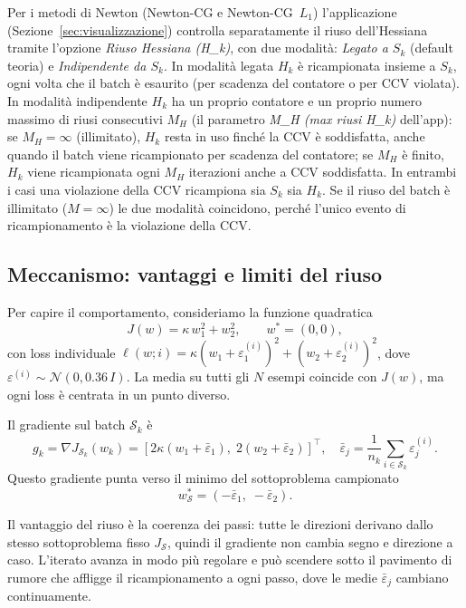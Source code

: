 Per i metodi di Newton (Newton-CG e Newton-CG~$L_1$) l'applicazione
(Sezione~\ref{sec:visualizzazione}) controlla separatamente il riuso
dell'Hessiana tramite l'opzione \emph{Riuso Hessiana (H\_k)}, con due
modalità: \emph{Legato a $S_k$} (default teoria) e \emph{Indipendente da
$S_k$}. In modalità legata $H_k$ è ricampionata insieme a $S_k$, ogni volta
che il batch è esaurito (per scadenza del contatore o per CCV violata). In
modalità indipendente $H_k$ ha un proprio contatore e un proprio numero
massimo di riusi consecutivi $M_H$ (il parametro \emph{M\_H (max riusi H\_k)}
dell'app): se $M_H = \infty$ (illimitato), $H_k$ resta in uso finché la CCV è
soddisfatta, anche quando il batch viene ricampionato per scadenza del
contatore; se $M_H$ è finito, $H_k$ viene ricampionata ogni $M_H$ iterazioni
anche a CCV soddisfatta. In entrambi i casi una violazione della CCV
ricampiona sia $S_k$ sia $H_k$. Se il riuso del batch è illimitato
($M = \infty$) le due modalità coincidono, perché l'unico evento di
ricampionamento è la violazione della CCV.

\subsection{Meccanismo: vantaggi e limiti del riuso}\label{app:riuso-meccanismo}

Per capire il comportamento, consideriamo la funzione quadratica
\[
J(w) = \kappa\, w_1^2 + w_2^2, \qquad w^* = (0,0),
\]
con loss individuale $\ell(w; i) = \kappa(w_1 + \varepsilon_1^{(i)})^2 +
(w_2 + \varepsilon_2^{(i)})^2$, dove $\varepsilon^{(i)} \sim \mathcal{N}(0,
0.36\,I)$. La media su tutti gli $N$ esempi coincide con $J(w)$, ma ogni loss
è centrata in un punto diverso.

Il gradiente sul batch $\mathcal{S}_k$ è
\[
g_k = \nabla J_{\mathcal{S}_k}(w_k)
= \left[2\kappa\!\left(w_1 + \bar\varepsilon_1\right),\;
        2\!\left(w_2 + \bar\varepsilon_2\right)\right]^\top,
\quad \bar\varepsilon_j = \frac{1}{n_k}\sum_{i\in\mathcal{S}_k}\varepsilon_j^{(i)}.
\]
Questo gradiente punta verso il minimo del sottoproblema campionato
\[
w^*_{\mathcal{S}} = (-\bar\varepsilon_1,\; -\bar\varepsilon_2).
\]

Il vantaggio del riuso è la coerenza dei passi: tutte le
direzioni derivano dallo stesso sottoproblema fisso $J_{\mathcal{S}}$,
quindi il gradiente non cambia segno e direzione a caso. L'iterato avanza
in modo più regolare e può scendere sotto il pavimento di rumore
che affligge il ricampionamento a ogni passo, dove le medie $\bar\varepsilon_j$
cambiano continuamente.

